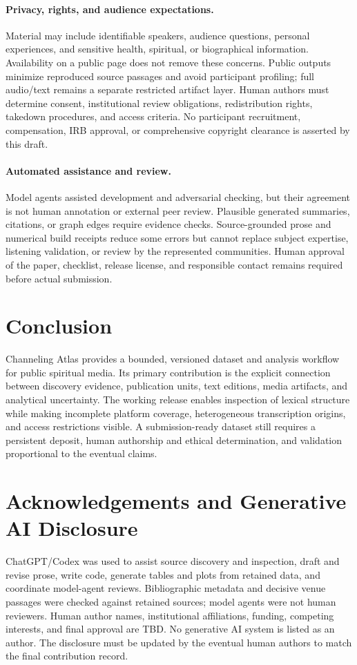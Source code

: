 \paragraph{Privacy, rights, and audience expectations.}
Material may include identifiable speakers, audience questions, personal experiences, and sensitive health, spiritual, or biographical information. Availability on a public page does not remove these concerns. Public outputs minimize reproduced source passages and avoid participant profiling; full audio/text remains a separate restricted artifact layer. Human authors must determine consent, institutional review obligations, redistribution rights, takedown procedures, and access criteria. No participant recruitment, compensation, IRB approval, or comprehensive copyright clearance is asserted by this draft.

\paragraph{Automated assistance and review.}
Model agents assisted development and adversarial checking, but their agreement is not human annotation or external peer review. Plausible generated summaries, citations, or graph edges require evidence checks. Source-grounded prose and numerical build receipts reduce some errors but cannot replace subject expertise, listening validation, or review by the represented communities. Human approval of the paper, checklist, release license, and responsible contact remains required before actual submission.

\section{Conclusion}
Channeling Atlas provides a bounded, versioned dataset and analysis workflow for public spiritual media. Its primary contribution is the explicit connection between discovery evidence, publication units, text editions, media artifacts, and analytical uncertainty. The working release enables inspection of lexical structure while making incomplete platform coverage, heterogeneous transcription origins, and access restrictions visible. A submission-ready dataset still requires a persistent deposit, human authorship and ethical determination, and validation proportional to the eventual claims.

\section*{Acknowledgements and Generative AI Disclosure}
ChatGPT/Codex was used to assist source discovery and inspection, draft and revise prose, write code, generate tables and plots from retained data, and coordinate model-agent reviews. Bibliographic metadata and decisive venue passages were checked against retained sources; model agents were not human reviewers. Human author names, institutional affiliations, funding, competing interests, and final approval are TBD. No generative AI system is listed as an author. The disclosure must be updated by the eventual human authors to match the final contribution record.
